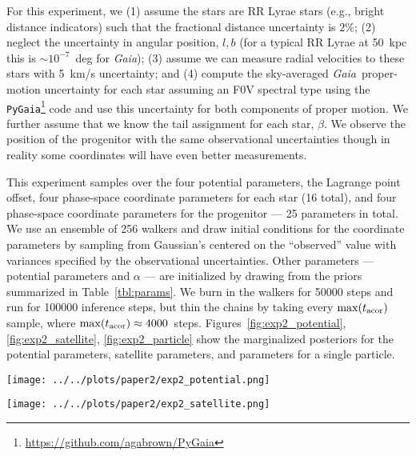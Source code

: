 \documentclass[letterpaper,12pt,preprint]{aastex}
\newcommand{\project}[1]{\textsl{#1}}
\newcommand{\gaia}{\project{Gaia}}
\newcommand{\Loffset}{\alpha}
\begin{document}
For this experiment, we (1) assume the stars are RR Lyrae stars (e.g., bright distance indicators) such that the fractional distance uncertainty is $2\%$; (2) neglect the uncertainty in angular position, $l,b$ (for a typical RR Lyrae at 50~kpc this is $\sim$$10^{-7}$~deg for \gaia); (3) assume we can measure radial velocities to these stars with 5~km/s uncertainty; and (4) compute the sky-averaged \gaia\, proper-motion uncertainty for each star assuming an F0V spectral type using the \texttt{PyGaia}\footnote{\url{https://github.com/agabrown/PyGaia}} code and use this uncertainty for both components of proper motion. We further assume that we know the tail assignment for each star, $\beta$. We observe the position of the progenitor with the same observational uncertainties though in reality some coordinates will have even better measurements.

This experiment samples over the four potential parameters, the Lagrange point offset, four phase-space coordinate parameters for each star (16 total), and four phase-space coordinate parameters for the progenitor --- 25 parameters in total. We use an ensemble of 256 walkers and draw initial conditions for the coordinate parameters by sampling from Gaussian's centered on the ``observed'' value with variances specified by the observational uncertainties. Other parameters --- potential parameters and $\Loffset$ --- are initialized by drawing from the priors summarized in Table~\ref{tbl:params}. We burn in the walkers for 50000 steps and run for 100000 inference steps, but thin the chains by taking every $\max(t_{\rm acor})$ sample, where $\max(t_{\rm acor}) \approx 4000$~steps. Figures~\ref{fig:exp2_potential}, \ref{fig:exp2_satellite}, \ref{fig:exp2_particle} show the marginalized posteriors for the potential parameters, satellite parameters, and parameters for a single particle. 

\begin{figure*}[!h]
\begin{center}
\texttt{[image: ../../plots/paper2/exp2\_potential.png]}
\caption{ Projections of the marginal posterior over the triaxial potential parameters for observed stars and progenitor with near-future uncertainties (Section~\ref{sec:exp2}). Axis ranges show the lower and upper bounds on the uniform priors over these parameters. }\label{fig:exp2_potential}
\end{center}
\end{figure*}

\begin{figure*}[!h]
\begin{center}
\texttt{[image: ../../plots/paper2/exp2\_satellite.png]}
\caption{ Projections of the marginal posterior over the progenitor parameters for observed stars and progenitor with near-future uncertainties (Section~\ref{sec:exp2}). }\label{fig:exp2_satellite}
\end{center}
\end{figure*}
\end{document}
